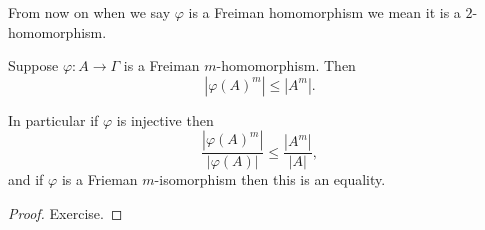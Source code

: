 \documentclass[a4paper]{article}
\begin{document}
From now on when we say \(\varphi\) is a Freiman homomorphism we mean it is a \(2\)-homomorphism.

\begin{lemma}[lemma 4.7]
  Suppose \(\varphi: A \to \Gamma\) is a Freiman \(m\)-homomorphism. Then
  \[
    |\varphi(A)^m| \leq |A^m|.
  \]

  In particular if \(\varphi\) is injective then
  \[
    \frac{|\varphi(A)^m|}{|\varphi(A)|} \leq \frac{|A^m|}{|A|},
  \]
  and if \(\varphi\) is a Frieman \(m\)-isomorphism then this is an equality.
\end{lemma}

\begin{proof}
  Exercise.
\end{proof}







\printindex
\end{document}
